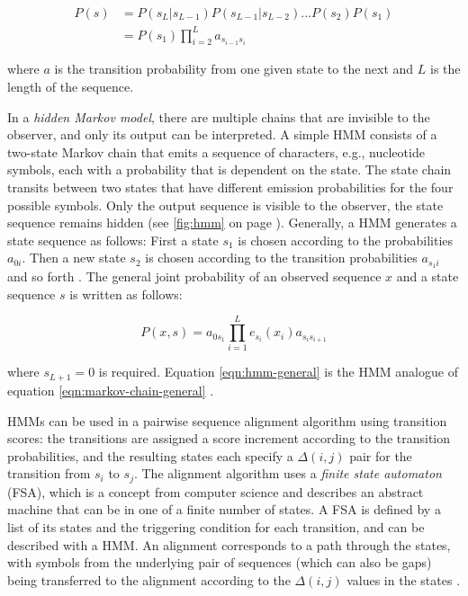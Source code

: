\begin{equation}
	\begin{split}
		P(s) &= P(s_L|s_{L-1}) P(s_{L-1}|s_{L-2}) . . . P(s_2) P(s_1) \\
		&= P(s_1) \prod^{L}_{i=2}a_{s_{i-1}s_{i}}
	\end{split}
	\label{eqn:markov-chain-general}
\end{equation}

where $a$ is the transition probability from one given state to the next and $L$
is the length of the sequence.

In a \emph{hidden Markov model}, there are multiple chains that are invisible to
the observer, and only its output can be interpreted. A simple HMM consists of a
two-state Markov chain that emits a sequence of characters, e.g., nucleotide
symbols, each with a probability that is dependent on the state. The state chain
transits between two states that have different emission probabilities for the
four possible symbols. Only the output sequence is visible to the observer, the
state sequence remains hidden (see \autoref{fig:hmm} on page \pageref{fig:hmm}).
Generally, a HMM generates a state sequence as follows: First a state $s_1$ is
chosen according to the probabilities $a_{0i}$. Then a new state $s_2$ is
chosen according to the transition probabilities $a_{s_{1}i}$ and so forth
\citep{durbin1998}. The general joint probability of an observed sequence $x$
and a state sequence $s$ is written as follows:

\begin{equation}
P(x,s) = a_{0s_1} \prod_{i=1}^L e_{s_i}(x_i)a_{s_is_{i+1}}
\label{eqn:hmm-general}
\end{equation}

where $s_{L+1} = 0$ is required. Equation \eqref{eqn:hmm-general} is the HMM
analogue of equation \eqref{eqn:markov-chain-general} \citep{durbin1998}.



HMMs can be used in a pairwise sequence alignment algorithm using transition
scores: the transitions are assigned a score increment according to the
transition probabilities, and the resulting states each specify a $\Delta(i,j)$
pair for the transition from $s_i$ to $s_j$. The alignment algorithm uses a
\emph{finite state automaton} (FSA), which is a concept from computer science
and describes an abstract machine that can be in one of a finite number of
states. A FSA is defined by a list of its states and the triggering condition
for each transition, and can be described with a HMM. An alignment corresponds
to a path through the states, with symbols from the underlying pair of
sequences (which can also be gaps) being transferred to the alignment according
to the $\Delta(i,j)$ values in the states \citep{durbin1998}. 

